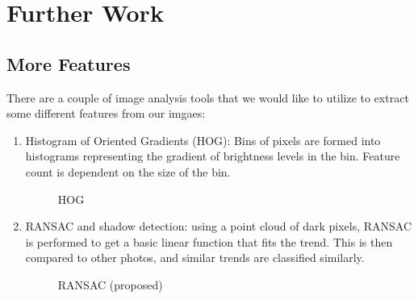 \documentclass{article}
\begin{document}
\section{Further Work}

\subsection{More Features}
There are a couple of image analysis tools that we would like to utilize to extract some different features from our imgaes: 
\begin{enumerate}[1.]
\item Histogram of Oriented Gradients (HOG): Bins of pixels are formed into histograms representing the gradient of brightness levels in the bin. Feature count is dependent on the size of the bin. 
\begin{figure}[H]
\centering
\setlength\fboxsep{2pt}
\setlength\fboxrule{0pt}
\caption{
HOG
}
\end{figure}

\item RANSAC and shadow detection: using a point cloud of dark pixels, RANSAC is performed to get a basic linear function that fits the trend. This is then compared to other photos, and similar trends are classified similarly.
\begin{figure}[H]
\centering
\setlength\fboxsep{2pt}
\setlength\fboxrule{0pt}
\caption{
RANSAC (proposed)
}
\end{figure}

\end{enumerate}
\end{document}
